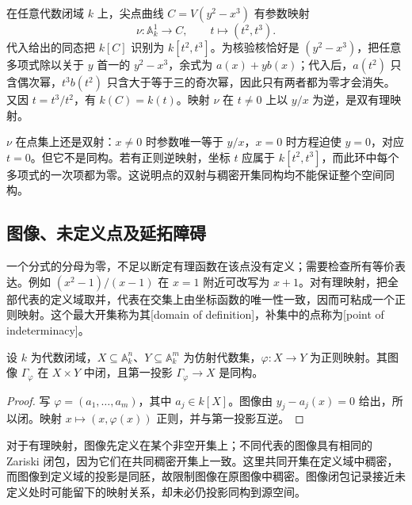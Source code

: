 \begin{example}\label{g5:exm:cusp-birational}
	在任意代数闭域 \(k\) 上，尖点曲线 \(C=V(y^2-x^3)\) 有参数映射
	\[
		\nu:\mathbb A_k^1\longrightarrow C,\qquad t\longmapsto(t^2,t^3).
	\]
	代入给出的同态把 \(k[C]\) 识别为 \(k[t^2,t^3]\)。为核验核恰好是 \((y^2-x^3)\)，把任意多项式除以关于 \(y\) 首一的 \(y^2-x^3\)，余式为 \(a(x)+yb(x)\)；代入后，\(a(t^2)\) 只含偶次幂，\(t^3b(t^2)\) 只含大于等于三的奇次幂，因此只有两者都为零才会消失。又因 \(t=t^3/t^2\)，有 \(k(C)=k(t)\)。映射 \(\nu\) 在 \(t\ne0\) 上以 \(y/x\) 为逆，是双有理映射。

	\(\nu\) 在点集上还是双射：\(x\ne0\) 时参数唯一等于 \(y/x\)，\(x=0\) 时方程迫使 \(y=0\)，对应 \(t=0\)。但它不是同构。若有正则逆映射，坐标 \(t\) 应属于 \(k[t^2,t^3]\)，而此环中每个多项式的一次项都为零。这说明点的双射与稠密开集同构均不能保证整个空间同构。
\end{example}

\subsection{图像、未定义点及延拓障碍}
\label{g5:subsec:0102:04}

一个分式的分母为零，不足以断定有理函数在该点没有定义；需要检查所有等价表达。例如 \((x^2-1)/(x-1)\) 在 \(x=1\) 附近可改写为 \(x+1\)。对有理映射，把全部代表的定义域取并，代表在交集上由坐标函数的唯一性一致，因而可粘成一个正则映射。这个最大开集称为其[domain of definition]，补集中的点称为[point of indeterminacy]。

\begin{proposition}\label{g5:prop:graph-affine}
	设 \(k\) 为代数闭域，\(X\subseteq\mathbb A_k^n\)、\(Y\subseteq\mathbb A_k^m\) 为仿射代数集，\(\varphi:X\rightarrow Y\) 为正则映射。其图像 \(\Gamma_\varphi\) 在 \(X\times Y\) 中闭，且第一投影 \(\Gamma_\varphi\rightarrow X\) 是同构。
\end{proposition}
\begin{proof}
	写 \(\varphi=(a_1,\ldots,a_m)\)，其中 \(a_j\in k[X]\)。图像由 \(y_j-a_j(x)=0\) 给出，所以闭。映射 \(x\mapsto(x,\varphi(x))\) 正则，并与第一投影互逆。
\end{proof}

对于有理映射，图像先定义在某个非空开集上；不同代表的图像具有相同的 Zariski 闭包，因为它们在共同稠密开集上一致。这里共同开集在定义域中稠密，而图像到定义域的投影是同胚，故限制图像在原图像中稠密。图像闭包记录接近未定义处时可能留下的映射关系，却未必仍投影同构到源空间。

